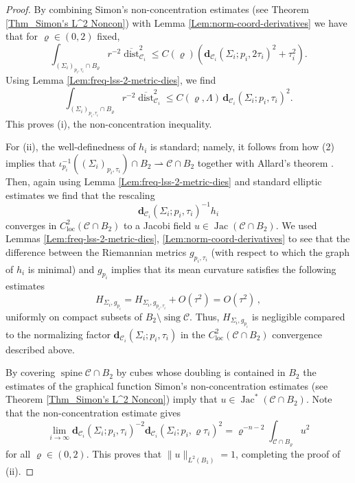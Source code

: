 \documentclass[11pt, letterpaper, reqno]{amsart}
\numberwithin{equation}{section}
\theoremstyle{remark}
\newcommand{\cC}{\mathcal{C}}
\newcommand{\mbfd}{\mathbf{d}}
\newcommand{\dist}{\operatorname{dist}}
\newcommand{\sing}{\operatorname{sing}}
\newcommand{\Jac}{\operatorname{Jac}}
\newcommand{\spine}{\operatorname{spine}}
\newcommand{\Sdist}{\overline{\dist}}
\begin{document}
\begin{proof}
By combining Simon's non-concentration estimates (see Theorem \ref{Thm_Simon's L^2 Noncon}) with Lemma \ref{Lem:norm-coord-derivatives} we have that for $\varrho \in (0,2)$ fixed, 
\[
 \int_{(\Sigma_i)_{p_i,\tau_i} \cap B_\varrho}  r^{-2}\Sdist_{\cC_i}^2 \leq C(\varrho) \left( \mbfd_{\cC_i}(\Sigma_i;p_i,2\tau_i)^2 + \tau_i^2 \right). 
\]
Using Lemma \ref{Lem:freq-lss-2-metric-dies}, we find 
\[
\int_{(\Sigma_i)_{p_i,\tau_i} \cap B_\varrho}  r^{-2}\Sdist_{\cC_i}^2 \leq C(\varrho,\Lambda) \, \mbfd_{\cC_i}(\Sigma_i;p_i,\tau_i)^2.
\]
This proves {(i)}, the non-concentration inequality.

For {(ii)}, the well-definedness of $h_i$ is standard; namely, it follows from how (2) implies that $\iota_{p_i}^{-1} ((\Sigma_i)_{p_i, \tau_i}) \cap B_2 \rightharpoonup \cC \cap B_2$ together with Allard's theorem \cite{Allard:first-variation}. Then, again using Lemma \ref{Lem:freq-lss-2-metric-dies} and standard elliptic estimates we find that the rescaling
\[ \mbfd_{\cC_i}(\Sigma_i;p_i,\tau_i)^{-1} h_i \]
converges in $C^2_\textrm{loc}(\cC\cap B_2)$ to a Jacobi field $u \in \Jac(\cC \cap B_2)$. We used Lemmas \ref{Lem:freq-lss-2-metric-dies}, \ref{Lem:norm-coord-derivatives} to see that the difference between the Riemannian metrics $g_{p_i,\tau_i}$ (with respect to which the graph of $h_i$ is minimal) and $g_{p_i}$ implies that its mean curvature satisfies the following estimates 
$$H_{\Sigma_i,g_{p_i}} = H_{\Sigma_i,g_{p_i,\tau_i}}+ O(\tau^2) =  O(\tau^2)\, ,$$
uniformly on compact subsets of $B_2 \setminus \sing \cC$. Thus, $H_{\Sigma_i,g_{p_i}}$ is negligible compared to the normalizing factor $\mbfd_{\cC_i}(\Sigma_i;p_i,\tau_i)$ in the $C^2_\textrm{loc}(\cC\cap B_2)$ convergence described above. 

By covering $\spine \cC \cap B_2$ by cubes whose doubling is contained in $B_2$ the estimates of the graphical function Simon's non-concentration estimates (see Theorem \ref{Thm_Simon's L^2 Noncon}) imply that $u \in \Jac^*(\cC \cap B_2)$. Note that the non-concentration estimate gives
\begin{equation} \label{eq:nonconc-Jac-L2-limit}
\lim_{i\to\infty} \mbfd_{\cC_i}(\Sigma_i;p_i,\tau_i)^{-2}\mbfd_{\cC_i}(\Sigma_i;p_i,\varrho\tau_i)^2 = \varrho^{-n-2} \int_{\cC \cap B_\varrho} u^2
\end{equation}
for all $\varrho \in (0,2)$. This proves that $\|u\|_{L^2(B_1)} = 1$, completing the proof of {(ii)}.


\end{proof}
\end{document}
